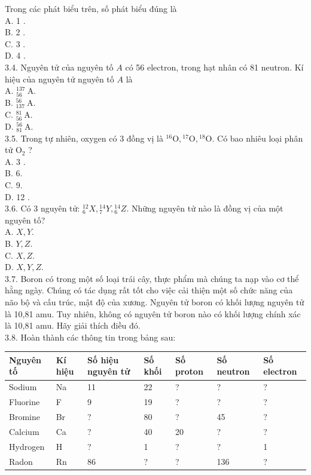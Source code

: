 \documentclass[10pt]{article}
\begin{document}
Trong các phát biểu trên, số phát biểu đúng là\\
A. 1 .\\
B. 2 .\\
C. 3 .\\
D. 4 .\\
3.4. Nguyên tử của nguyên tố $A$ có 56 electron, trong hạt nhân có 81 neutron. Kí hiệu của nguyên tử nguyên tố $A$ là\\
A. ${ }_{56}^{137} \mathrm{~A}$.\\
B. ${ }_{137}^{56} \mathrm{~A}$.\\
C. ${ }_{56}^{81} \mathrm{~A}$.\\
D. ${ }_{81}^{56} \mathrm{~A}$.\\
3.5. Trong tự nhiên, oxygen có 3 đồng vị là ${ }^{16} \mathrm{O},{ }^{17} \mathrm{O},{ }^{18} \mathrm{O}$. Có bao nhiêu loại phân tử $\mathrm{O}_{2}$ ?\\
A. 3 .\\
B. 6.\\
C. 9.\\
D. 12 .\\
3.6. Có 3 nguyên tử: ${ }_{6}^{12} X,{ }_{7}^{14} Y,{ }_{6}^{14} Z$. Những nguyên tử nào là đồng vị của một nguyên tố?\\
A. $X, Y$.\\
B. $Y, Z$.\\
C. $X, Z$.\\
D. $X, Y, Z$.\\
3.7. Boron có trong một số loại trái cây, thực phẩm mà chúng ta nạp vào cơ thể hằng ngày. Chúng có tác dụng rất tốt cho việc cải thiện một số chức năng của não bộ và cấu trúc, mật độ của xương. Nguyên tử boron có khối lượng nguyên tử là 10,81 amu. Tuy nhiên, không có nguyên tử boron nào có khối lượng chính xác là 10,81 amu. Hãy giải thích điều đó.\\
3.8. Hoàn thành các thông tin trong bảng sau:

\begin{center}
\begin{tabular}{|l|l|l|l|l|l|l|}
\hline
Nguyên tố & Kí hiệu & Số hiệu nguyên tử & Số khối & Số proton & Số neutron & Số electron \\
\hline
Sodium & Na & 11 & 22 & ? & ? & ? \\
\hline
Fluorine & F & 9 & 19 & ? & ? & ? \\
\hline
Bromine & Br & ? & 80 & ? & 45 & ? \\
\hline
Calcium & Ca & ? & 40 & 20 & ? & ? \\
\hline
Hydrogen & H & ? & 1 & ? & ? & 1 \\
\hline
Radon & Rn & 86 & ? & ? & 136 & ? \\
\hline
\end{tabular}
\end{center}
\end{document}
